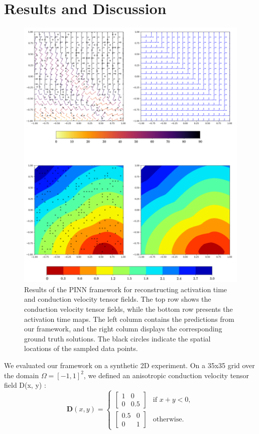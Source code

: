 \section{Results and Discussion}
\begin{figure}
    \centering
    \includegraphics[width=1\linewidth]{figures/results.png}
    \caption{Results of the PINN framework for reconstructing activation time and conduction velocity tensor fields. The top row shows the conduction velocity tensor fields, while the bottom row presents the activation time maps. The left column contains the predictions from our framework, and the right column displays the corresponding ground truth solutions. The black circles indicate the spatial locations of the sampled data points.}
    \label{fig:results}
\end{figure}
We evaluated our framework on a synthetic 2D experiment. On a 35x35 grid over the domain $\Omega = [-1,1]^2$, we defined an anisotropic conduction velocity tensor field D(x, y) \cite{RuizHerrera2022}:
\begin{equation}
\mathbf{D}(x, y) =
\begin{cases}
\begin{bmatrix} 1 & 0 \\ 0 & 0.5 \end{bmatrix} & \text{if } x + y < 0, \\
\begin{bmatrix} 0.5 & 0 \\ 0 & 1 \end{bmatrix} & \text{otherwise.}
\end{cases}
\end{equation}

